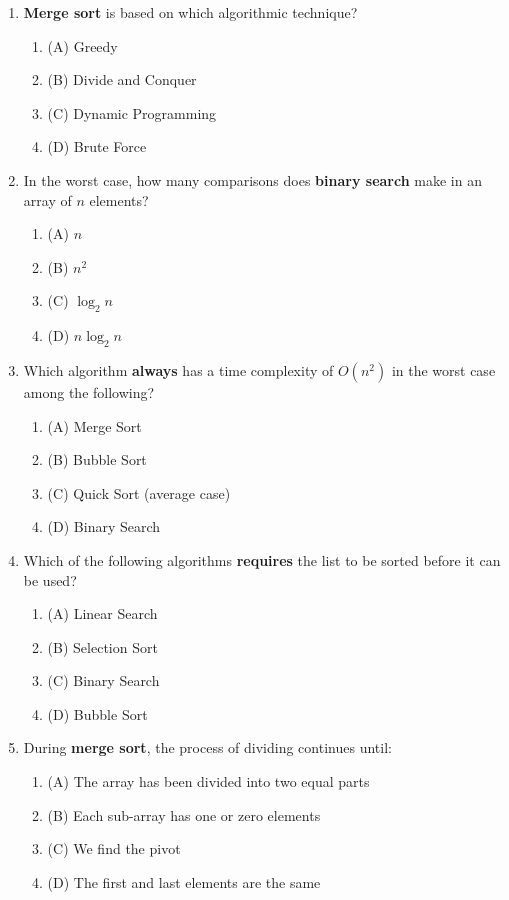 \documentclass[a4paper,12pt]{article}
\begin{document}
\begin{enumerate}
    \item \textbf{Merge sort} is based on which algorithmic technique?
    \begin{enumerate}
        \item (A) Greedy
        \item (B) Divide and Conquer
        \item (C) Dynamic Programming
        \item (D) Brute Force
    \end{enumerate}

    \item In the worst case, how many comparisons does \textbf{binary search} make in an array of $n$ elements?
    \begin{enumerate}
        \item (A) $n$
        \item (B) $n^2$
        \item (C) $\log_2 n$
        \item (D) $n \log_2 n$
    \end{enumerate}

    \item Which algorithm \textbf{always} has a time complexity of $O(n^2)$ in the worst case among the following?
    \begin{enumerate}
        \item (A) Merge Sort
        \item (B) Bubble Sort
        \item (C) Quick Sort (average case)
        \item (D) Binary Search
    \end{enumerate}

    \item Which of the following algorithms \textbf{requires} the list to be sorted before it can be used?
    \begin{enumerate}
        \item (A) Linear Search
        \item (B) Selection Sort
        \item (C) Binary Search
        \item (D) Bubble Sort
    \end{enumerate}

    \item During \textbf{merge sort}, the process of dividing continues until:
    \begin{enumerate}
        \item (A) The array has been divided into two equal parts
        \item (B) Each sub-array has one or zero elements
        \item (C) We find the pivot
        \item (D) The first and last elements are the same
    \end{enumerate}


\end{enumerate}
\end{document}
